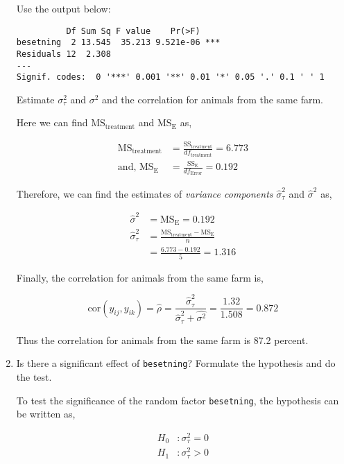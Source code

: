 \documentclass[11pt,a4paper]{article}
\begin{document}
\begin{enumerate}
  Use the output below:

\begin{verbatim}
          Df Sum Sq F value    Pr(>F)    
besetning  2 13.545  35.213 9.521e-06 ***
Residuals 12  2.308                      
---
Signif. codes:  0 '***' 0.001 '**' 0.01 '*' 0.05 '.' 0.1 ' ' 1
\end{verbatim}

  Estimate \(\sigma_\tau^2\) and \(\sigma^2\) and the correlation for
  animals from the same farm.

  Here we can find \(\text{MS}_\text{treatment}\) and
  \(\text{MS}_\text{E}\) as,

  \[
  \begin{aligned}
  \text{MS}_\text{treatment} &= \frac{\text{SS}_\text{treatment}}{df_\text{treatment}}
  = 6.773 \\
  \text{and, }\text{MS}_\text{E} &= \frac{\text{SS}_\text{E}}{df_\text{Error}}
  = 0.192
  \end{aligned}
  \]

  Therefore, we can find the estimates of \emph{variance components}
  \(\hat{\sigma}_\tau^2\) and \(\hat{\sigma}^2\) as,

  \[
  \begin{aligned}
  \hat{\sigma}^2 &= \text{MS}_\text{E} = 0.192 \\
  \hat{\sigma}_\tau^2 &= \frac{\text{MS}_\text{treatment}-\text{MS}_\text{E}}{n} \\
  &= \frac{6.773 - 0.192}{5}
  = 1.316
  \end{aligned}
  \]

  Finally, the correlation for animals from the same farm is,

  \[
  \text{cor}(y_{ij}, y_{ik}) = \hat{\rho} = \frac{\hat{\sigma}_\tau^2}{\hat{\sigma}_\tau^2 + \hat{\sigma^2}} = \frac{1.32}{1.508} 
  = 0.872
  \]

  Thus the correlation for animals from the same farm is 87.2 percent.
\item
  Is there a significant effect of \texttt{besetning}? Formulate the
  hypothesis and do the test.

  To test the significance of the random factor \texttt{besetning}, the
  hypothesis can be written as,

  \[
  \begin{aligned}
  H_0 &: \sigma_\tau^2 = 0 \\
  H_1 &: \sigma_\tau^2 > 0
  \end{aligned}
  \]


\end{enumerate}
\end{document}
